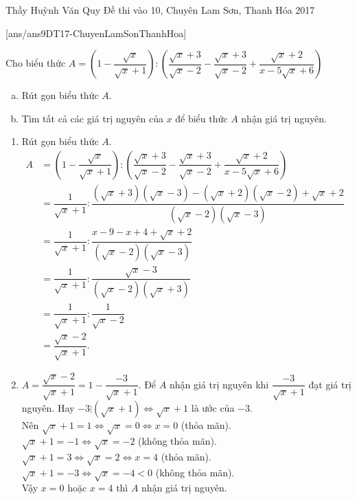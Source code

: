 \begin{name}
{Thầy  Huỳnh Văn Quy}
{Đề thi vào 10, Chuyên Lam Sơn, Thanh Hóa 2017}
\end{name}
\setcounter{ex}{0}
[ans/ans9DT17-ChuyenLamSonThanhHoa]
\begin{ex}%
	Cho biểu thức $A=\left(1-\dfrac{\sqrt{x}}{\sqrt{x}+1}\right):\left(\dfrac{\sqrt{x}+3}{\sqrt{x}-2}-\dfrac{\sqrt{x}+3}{\sqrt{x}-2}+\dfrac{\sqrt{x}+2}{x-5\sqrt{x}+6}\right)$
    \begin{enumerate}[a)]
        \item Rút gọn biểu thức $A$.
        \item Tìm tất cả các giá trị nguyên của $x$ để biểu thức $A$ nhận giá trị nguyên.
    \end{enumerate}
\loigiai
    {\hfill
    \begin{enumerate}
        \item Rút gọn biểu thức $A$.\\
        $\begin{aligned}
        	A&=\left(1-\dfrac{\sqrt{x}}{\sqrt{x}+1}\right):\left(\dfrac{\sqrt{x}+3}{\sqrt{x}-2}-\dfrac{\sqrt{x}+3}{\sqrt{x}-2}+\dfrac{\sqrt{x}+2}{x-5\sqrt{x}+6}\right)\\
        	&=\dfrac{1}{\sqrt{x}+1}:\dfrac{(\sqrt{x}+3)(\sqrt{x}-3)-(\sqrt{x}+2)(\sqrt{x}-2)+\sqrt{x}+2}{(\sqrt{x}-2)(\sqrt{x}-3)}\\
        	&=\dfrac{1}{\sqrt{x}+1}:\dfrac{x-9-x+4+\sqrt{x}+2}{(\sqrt{x}-2)(\sqrt{x}-3)}\\
        	&=\dfrac{1}{\sqrt{x}+1}:\dfrac{\sqrt{x}-3}{(\sqrt{x}-2)(\sqrt{x}+3)}\\
        	&=\dfrac{1}{\sqrt{x}+1}:\dfrac{1}{\sqrt{x}-2}\\
        	&=\dfrac{\sqrt{x}-2}{\sqrt{x}+1}.
        \end{aligned}$
       	\item $A=\dfrac{\sqrt{x}-2}{\sqrt{x}+1}=1-\dfrac{-3}{\sqrt{x}+1}$. Để $A$ nhận giá trị nguyên khi $\dfrac{-3}{\sqrt{x}+1}$ đạt giá trị nguyên. Hay $-3\vdots(\sqrt{x}+1)\Leftrightarrow \sqrt{x}+1$ là ước của $-3$.\\
       	Nên $\sqrt{x}+1=1\Leftrightarrow \sqrt{x}=0\Leftrightarrow x=0$ (thỏa mãn).\\
       	$\sqrt{x}+1=-1\Leftrightarrow \sqrt{x}=-2$ (không thỏa mãn).\\
       	$\sqrt{x}+1=3\Leftrightarrow \sqrt{x}=2\Leftrightarrow x=4$ (thỏa mãn).\\
       	$\sqrt{x}+1=-3\Leftrightarrow \sqrt{x}=-4<0$ (không thỏa mãn).\\
       	Vậy $x=0$ hoặc $x=4$ thì $A$ nhận giá trị nguyên.
    \end{enumerate}
    }
\end{ex}

